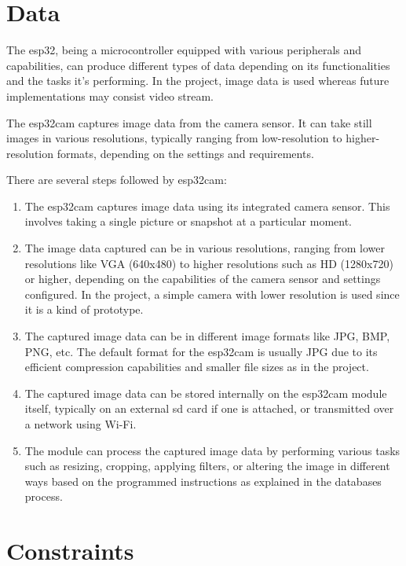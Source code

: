 \section{Data}
The \ac{esp32}, being a microcontroller equipped with various peripherals and capabilities, can produce different types of data depending on its functionalities and the tasks it's performing. In the project, image data is used whereas future implementations may consist video stream. 

\medskip

The \ac{esp32cam} captures image data from the camera sensor. It can take still images in various resolutions, typically ranging from low-resolution to higher-resolution formats, depending on the settings and requirements. 

\medskip

There are several steps followed by \ac{esp32cam}:

\begin{enumerate}
    \item The \ac{esp32cam} captures image data using its integrated camera sensor. This involves taking a single picture or snapshot at a particular moment.
    \item The image data captured can be in various resolutions, ranging from lower resolutions like VGA (640x480) to higher resolutions such as HD (1280x720) or higher, depending on the capabilities of the camera sensor and settings configured. In the project, a simple camera with lower resolution is used since it is a kind of prototype.
    \item The captured image data can be in different image formats like JPG, BMP, PNG, etc. The default format for the \ac{esp32cam} is usually JPG due to its efficient compression capabilities and smaller file sizes as in the project.
    \item The captured image data can be stored internally on the \ac{esp32cam} module itself, typically on an external \ac{sd} card if one is attached, or transmitted over a network using Wi-Fi.
    \item The module can process the captured image data by performing various tasks such as resizing, cropping, applying filters, or altering the image in different ways based on the programmed instructions as explained in the databases process.
\end{enumerate}

\medskip

\section{Constraints}

